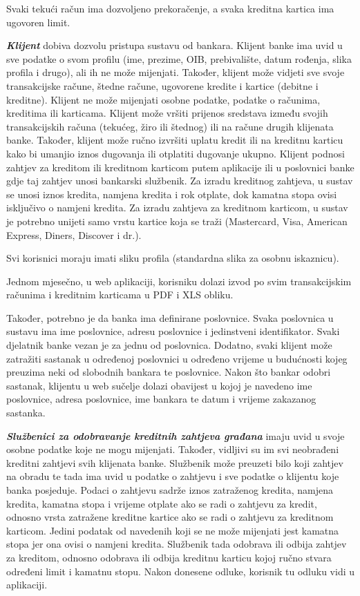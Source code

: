 		Svaki tekući račun ima dozvoljeno prekoračenje, a svaka kreditna kartica ima ugovoren limit.
		
		\textit{\textbf{Klijent}} dobiva dozvolu pristupa sustavu od bankara. Klijent banke ima uvid u sve podatke o svom profilu (ime, prezime, OIB, prebivalište, datum rođenja, slika profila i drugo), ali ih ne može mijenjati. Također, klijent može vidjeti sve svoje transakcijske račune, štedne račune, ugovorene kredite i kartice (debitne i kreditne). Klijent ne može mijenjati osobne podatke, podatke o računima, kreditima ili karticama. Klijent može vršiti prijenos sredstava između svojih transakcijskih računa (tekućeg, žiro ili štednog) ili na račune drugih klijenata banke. Također, klijent može ručno izvršiti uplatu kredit ili na kreditnu karticu kako bi umanjio iznos dugovanja ili otplatiti dugovanje ukupno.
		Klijent podnosi zahtjev za kreditom ili kreditnom karticom putem aplikacije ili u poslovnici banke gdje taj zahtjev unosi bankarski službenik. Za izradu kreditnog zahtjeva, u sustav se unosi iznos kredita, namjena kredita i rok otplate, dok kamatna stopa ovisi isključivo o namjeni kredita. Za izradu zahtjeva za kreditnom karticom, u sustav je potrebno unijeti samo vrstu kartice koja se traži (Mastercard, Visa, American Express, Diners, Discover i dr.).
		
		Svi korisnici moraju imati sliku profila (standardna slika za osobnu iskaznicu).
		
		Jednom mjesečno, u web aplikaciji, korisniku dolazi izvod po svim transakcijskim računima i kreditnim karticama u PDF i XLS obliku.
		
		Također, potrebno je da banka ima definirane poslovnice. Svaka poslovnica u sustavu ima ime poslovnice, adresu poslovnice i jedinstveni identifikator. Svaki djelatnik banke vezan je za jednu od poslovnica. Dodatno, svaki klijent može zatražiti sastanak u određenoj poslovnici u određeno vrijeme u budućnosti kojeg preuzima neki od slobodnih bankara te poslovnice. Nakon što bankar odobri sastanak, klijentu u web sučelje dolazi obavijest u kojoj je navedeno ime poslovnice, adresa poslovnice, ime bankara te datum i vrijeme zakazanog sastanka.
		
		\textit{\textbf{Službenici za odobravanje kreditnih zahtjeva građana}} imaju uvid u svoje osobne podatke koje ne mogu mijenjati. Također, vidljivi su im svi neobrađeni kreditni zahtjevi svih klijenata banke. Službenik može preuzeti bilo koji zahtjev na obradu te tada ima uvid u podatke o zahtjevu i sve podatke o klijentu koje banka posjeduje. Podaci o zahtjevu sadrže iznos zatraženog kredita, namjena kredita, kamatna stopa i vrijeme otplate ako se radi o zahtjevu za kredit, odnosno vrsta zatražene kreditne kartice ako se radi o zahtjevu za kreditnom karticom. Jedini podatak od navedenih koji se ne može mijenjati jest kamatna stopa jer ona ovisi o namjeni kredita. Službenik tada odobrava ili odbija zahtjev za kreditom, odnosno odobrava ili odbija kreditnu karticu kojoj ručno stvara određeni limit i kamatnu stopu.
		Nakon donesene odluke, korisnik tu odluku vidi u aplikaciji.
		
